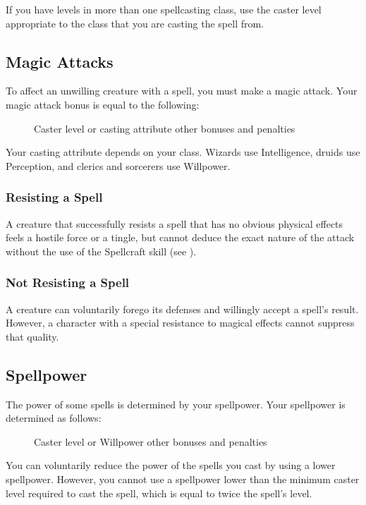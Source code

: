  If you have levels in more than one spellcasting class, use the caster level appropriate to the class that you are casting the spell from.

\subsection{Magic Attacks}

To affect an unwilling creature with a spell, you must make a magic attack. Your magic attack bonus is equal to the following:

\begin{figure}[h]
    \centering Caster level or casting attribute  \add other bonuses and penalties
\end{figure}

 Your casting attribute depends on your class. Wizards use Intelligence, druids use Perception, and clerics and sorcerers use Willpower.

\subsubsection{Resisting a Spell} A creature that successfully resists a spell that has no obvious physical effects feels a hostile force or a tingle, but cannot deduce the exact nature of the attack without the use of the Spellcraft skill (see ).

\subsubsection{Not Resisting a Spell} A creature can voluntarily forego its defenses and willingly accept a spell's result. However, a character with a special resistance to magical effects cannot suppress that quality.

\subsection{Spellpower}

The power of some spells is determined by your spellpower. Your spellpower is determined as follows:

\begin{figure}[h]
    \centering Caster level or Willpower  \add other bonuses and penalties
\end{figure}

 You can voluntarily reduce the power of the spells you cast by using a lower spellpower. However, you cannot use a spellpower lower than the minimum caster level required to cast the spell, which is equal to twice the spell's level.

